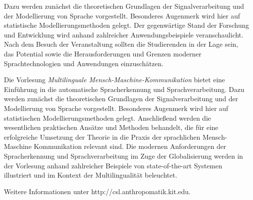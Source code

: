 \begin{module}
\begin{learningoutcomes}
 

Dazu werden zunächst die theoretischen Grundlagen der Signalverarbeitung und der Modellierung von Sprache vorgestellt. Besonderes Augenmerk wird hier auf statistische Modellierungsmethoden gelegt. Der gegenwärtige Stand der Forschung und Entwicklung wird anhand zahlreicher Anwendungsbeispiele veranschaulicht. Nach dem Besuch der Veranstaltung sollten die Studierenden in der Lage sein, das Potential sowie die Herausforderungen und Grenzen moderner Sprachtechnologien und Anwendungen einzuschätzen.


\end{learningoutcomes}

\begin{content}
Die Vorlesung \emph{Multilinguale Mensch-Maschine-Kommunikation} bietet eine Einführung in die automatische Spracherkennung und Sprachverarbeitung. Dazu werden zunächst die theoretischen Grundlagen der Signalverarbeitung und der Modellierung von Sprache vorgestellt. Besonderes Augenmerk wird hier auf statistischen Modellierungsmethoden gelegt. Anschließend werden die wesentlichen praktischen Ansätze und Methoden behandelt, die für eine erfolgreiche Umsetzung der Theorie in die Praxis der sprachlichen Mensch-Maschine Kommunikation relevant sind. Die modernen Anforderungen der Spracherkennung und Sprachverarbeitung im Zuge der Globalisierung werden in der Vorlesung anhand zahlreicher Beispiele von state-of-the-art Systemen illustriert und im Kontext der Multilingualität beleuchtet.

 

Weitere Informationen unter http://csl.anthropomatik.kit.edu.


\end{content}



\end{module}

